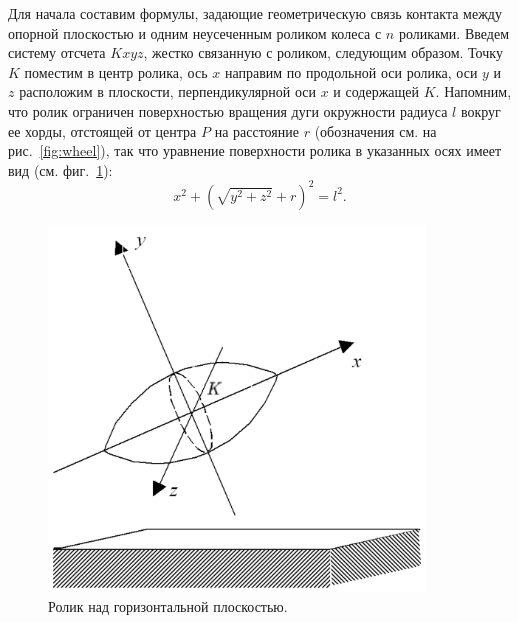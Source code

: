 

Для начала составим формулы, задающие геометрическую связь контакта между опорной плоскостью и одним неусеченным роликом колеса с $n$ роликами. Введем систему отсчета $Kxyz$, жестко связанную с роликом, следующим образом. Точку $K$ поместим в центр ролика, ось $x$ направим по продольной оси ролика, оси $y$ и $z$ расположим в плоскости, перпендикулярной оси $x$ и содержащей $K$. Напомним, что ролик ограничен поверхностью вращения дуги окружности радиуса $l$ вокруг ее хорды, отстоящей от центра $P$ на расстояние $r$ (обозначения см. на рис.~\ref{fig:wheel}), так что уравнение поверхности ролика в указанных осях имеет вид (см. фиг.~\ref{Roller}):
\begin{equation}
    x^2 + \left( \sqrt{ y^2 + z^2 } + r \right)^2 = l^2.
\end{equation}

\begin{figure}[htb]
    \centering
    \includegraphics[width=10cm]{content/pic/modelica/Roller.png}
    \caption{Ролик над горизонтальной плоскостью.}
    \label{Roller}
\end{figure}

